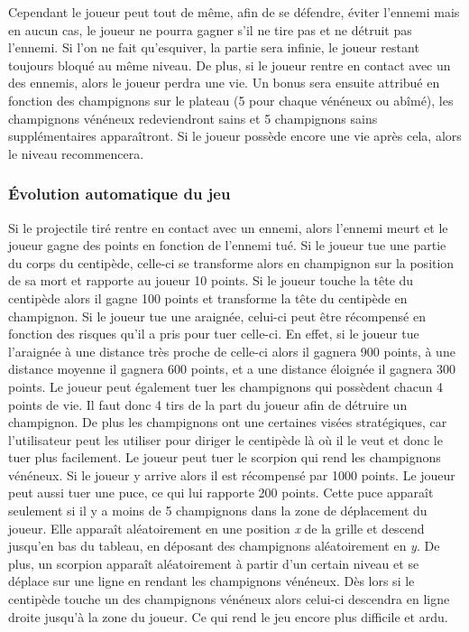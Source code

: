 
Cependant le joueur peut tout de même, afin de se défendre, éviter l'ennemi mais en aucun cas, le joueur ne pourra gagner s'il ne tire pas et ne détruit pas l'ennemi. Si l'on ne fait qu'esquiver, la partie sera infinie, le joueur restant toujours bloqué au même niveau. De plus, si le joueur rentre en contact avec un des ennemis, alors le joueur perdra une vie. Un bonus sera ensuite attribué en fonction des champignons sur le plateau (5 pour chaque vénéneux ou abîmé), les champignons vénéneux redeviendront sains et 5 champignons sains supplémentaires apparaîtront. Si le joueur possède encore une vie après cela, alors le niveau recommencera. 

\subsubsection{Évolution automatique du jeu}

Si le projectile tiré rentre en contact avec un ennemi, alors l'ennemi meurt et le joueur gagne des points en fonction de l'ennemi tué. Si le joueur tue une partie du corps du centipède, celle-ci se transforme alors en champignon sur la position de sa mort et rapporte au joueur 10 points. Si le joueur touche la tête du centipède alors il gagne 100 points et transforme la tête du centipède en champignon. Si le joueur tue une araignée, celui-ci peut être récompensé en fonction des risques qu'il a pris pour tuer celle-ci. En effet, si le joueur tue l'araignée à une distance très proche de celle-ci alors il gagnera 900 points, à une distance moyenne il gagnera 600 points, et a une distance éloignée il gagnera 300 points. Le joueur peut également tuer les champignons qui possèdent chacun 4 points de vie. Il faut donc 4 tirs de la part du joueur afin de détruire un champignon. De plus les champignons ont une certaines visées stratégiques, car l'utilisateur peut les utiliser pour diriger le centipède là où il le veut et donc le tuer plus facilement. Le joueur peut tuer le scorpion qui rend les champignons vénéneux. Si le joueur y arrive alors il est récompensé par 1000 points. Le joueur peut aussi tuer une puce, ce qui lui rapporte 200 points. Cette puce apparaît seulement si il y a moins de 5 champignons dans la zone de déplacement du joueur. Elle apparaît aléatoirement en une position \emph{x} de la grille et  descend jusqu'en bas du tableau, en déposant des champignons aléatoirement en \emph{y}. De plus, un scorpion apparaît aléatoirement à partir d'un certain niveau et se déplace sur une ligne en rendant les champignons vénéneux. Dès lors si le centipède touche un des champignons vénéneux alors celui-ci descendra en ligne droite jusqu'à la zone du joueur. Ce qui rend le jeu encore plus difficile et ardu.
